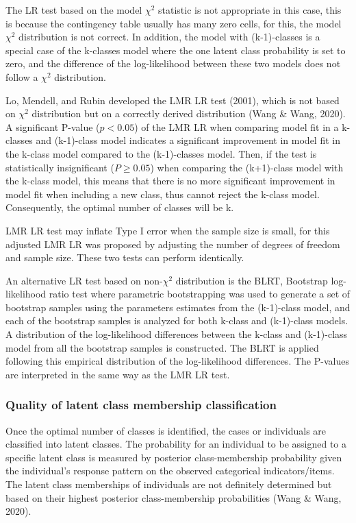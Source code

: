 \documentclass[12pt,a4paper,oneside]{reedthesis}
\begin{document}
The LR test based on the model \(\chi^2\) statistic is not appropriate in this case, this is because the contingency table usually has many zero cells, for this, the model \(\chi^2\) distribution is not correct. In addition, the model with (k-1)-classes is a special case of the k-classes model where the one latent class probability is set to zero, and the difference of the log-likelihood between these two models does not follow a \(\chi^2\) distribution.

Lo, Mendell, and Rubin developed the LMR LR test (2001), which is not based on \(\chi^2\) distribution but on a correctly derived distribution (Wang \& Wang, 2020). A significant P-value (\(p<0.05\)) of the LMR LR when comparing model fit in a k-classes and (k-1)-class model indicates a significant improvement in model fit in the k-class model compared to the (k-1)-classes model. Then, if the test is statistically insignificant (\(P\ge 0.05\)) when comparing the (k+1)-class model with the k-class model, this means that there is no more significant improvement in model fit when including a new class, thus cannot reject the k-class model. Consequently, the optimal number of classes will be k.

LMR LR test may inflate Type I error when the sample size is small, for this adjusted LMR LR was proposed by adjusting the number of degrees of freedom and sample size. These two tests can perform identically.

An alternative LR test based on non-\(\chi^2\) distribution is the BLRT, Bootstrap log-likelihood ratio test where parametric bootstrapping was used to generate a set of bootstrap samples using the parameters estimates from the (k-1)-class model, and each of the bootstrap samples is analyzed for both k-class and (k-1)-class models. A distribution of the log-likelihood differences between the k-class and (k-1)-class model from all the bootstrap samples is constructed. The BLRT is applied following this empirical distribution of the log-likelihood differences. The P-values are interpreted in the same way as the LMR LR test.

\hypertarget{quality-of-latent-class-membership-classification}{%
\subsubsection{Quality of latent class membership classification}\label{quality-of-latent-class-membership-classification}}

Once the optimal number of classes is identified, the cases or individuals are classified into latent classes. The probability for an individual to be assigned to a specific latent class is measured by posterior class-membership probability given the individual's response pattern on the observed categorical indicators/items. The latent class memberships of individuals are not definitely determined but based on their highest posterior class-membership probabilities (Wang \& Wang, 2020).
\end{document}
